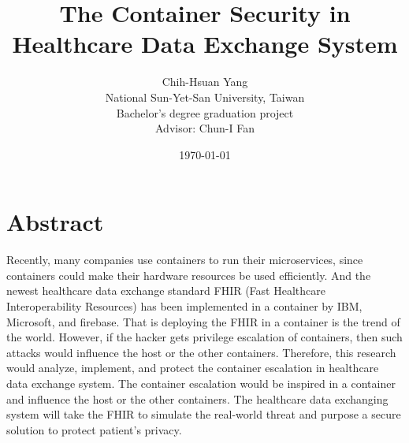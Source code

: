 \documentclass[12pt,a4paper]{article}
\title{{The Container Security in Healthcare Data Exchange System}}
\author{Chih-Hsuan Yang\\
National Sun-Yet-San University, Taiwan \\
Bachelor's degree graduation project \\
Advisor: Chun-I Fan
}
\date{\today}
\begin{document}
\section{Abstract}
Recently, many companies use containers to run their microservices, since containers could
make their hardware resources be used efficiently. And the newest healthcare data exchange
standard FHIR (Fast Healthcare Interoperability Resources) \cite{FHIR_home} has been implemented
in a container by IBM, Microsoft, and firebase. That is deploying the FHIR in a container is the
trend of the world. However, if the hacker gets privilege escalation of containers, then
such attacks would influence the host or the other containers. Therefore, this research would
analyze, implement, and protect the container escalation in healthcare data exchange system.
The container escalation would be inspired in a container and influence the host or the
other containers. The healthcare data exchanging system will take the FHIR to simulate
the real-world threat and purpose a secure solution to protect patient's privacy.

\end{document}
